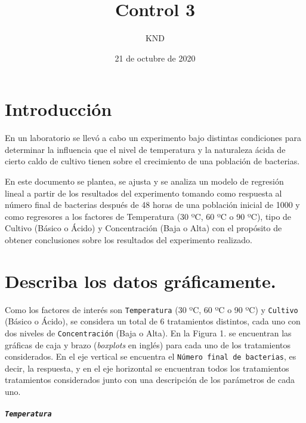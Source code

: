 \documentclass[10pt, spanish]{article}
\title{Control 3}
\date{21 de octubre de 2020}
\author{KND}
\begin{document}
    \maketitle




    \hypertarget{introducciuxf3n}{%
\section*{Introducción}\label{introducciuxf3n}}

    En un laboratorio se llevó a cabo un experimento bajo distintas
condiciones para determinar la influencia que el nivel de temperatura y
la naturaleza ácida de cierto caldo de cultivo tienen sobre el
crecimiento de una población de bacterias.

En este documento se plantea, se ajusta y se analiza un modelo de
regresión lineal a partir de los resultados del experimento tomando como
respuesta al número final de bacterias después de 48 horas de una
población inicial de 1000 y como regresores a los factores de
Temperatura (30 ºC, 60 ºC o 90 ºC), tipo de Cultivo (Básico o Ácido) y
Concentración (Baja o Alta) con el propósito de obtener conclusiones
sobre los resultados del experimento realizado.

    \hypertarget{describa-los-datos-gruxe1ficamente.}{%
\section{Describa los datos
gráficamente.}\label{describa-los-datos-gruxe1ficamente.}}

    Como los factores de interés son \texttt{Temperatura} (30 ºC, 60 ºC o 90
ºC) y \texttt{Cultivo} (Básico o Ácido), se considera un total de 6
tratamientos distintos, cada uno con dos niveles de
\texttt{Concentración} (Baja o Alta). En la Figura 1. se encuentran las
gráficas de caja y brazo (\emph{boxplots} en inglés) para cada uno de
los tratamientos considerados. En el eje vertical se encuentra el
\texttt{Número\ final\ de\ bacterias}, es decir, la respuesta, y en el
eje horizontal se encuentran todos los tratamientos tratamientos
considerados junto con una descripción de los parámetros de cada uno.

    \begin{center}
    \end{center}


    \hypertarget{temperatura}{%
\subparagraph{\texorpdfstring{\texttt{Temperatura}}{Temperatura}}\label{temperatura}}
\end{document}
